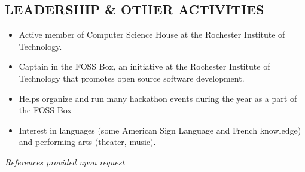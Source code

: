 \documentclass[line]{res}
\begin{document}
\begin{resume}
\section{LEADERSHIP \& OTHER ACTIVITIES}
	\begin{itemize}[leftmargin=10pt]
	\item Active member of Computer Science House at the Rochester Institute of Technology.
	\item Captain in the FOSS Box, an initiative at the Rochester Institute of Technology that promotes open source software development.
	\item Helps organize and run many hackathon events during the year as a part of the FOSS Box
	\item Interest in languages (some American Sign Language and French knowledge) and performing arts (theater, music).
	\end{itemize}

\begin{center}
\vspace{-0.26in}
\emph{References provided upon request\\[8pt]}
\end{center}

\end{resume}
\end{document}
